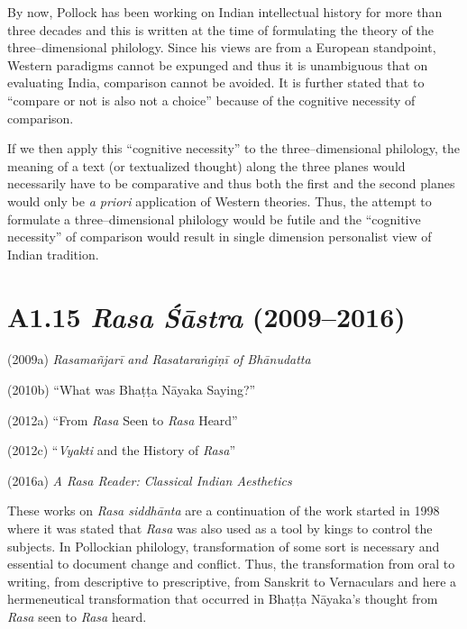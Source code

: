 By now, Pollock has been working on Indian intellectual history for more than three decades and this is written at the time of formulating the theory of the three–dimensional philology. Since his views are from a European standpoint, Western paradigms cannot be expunged and thus it is unambiguous that on evaluating India, comparison cannot be avoided. It is further stated that to “compare or not is also not a choice” because of the cognitive necessity of comparison.

If we then apply this “cognitive necessity” to the three–dimensional philology, the meaning of a text (or textualized thought) along the three planes would necessarily have to be comparative and thus both the first and the second planes would only be \textit{a priori} application of Western theories. Thus, the attempt to formulate a three–dimensional philology would be futile and the “cognitive necessity” of comparison would result in single dimension personalist view of Indian tradition.

\vspace{-.3cm}

\section*{A1.15 {\it{\textbf{Rasa Śāstra}}} (2009–2016)}

(2009a)\textit{ Rasamañjarī and Rasataraṅgiṇī of Bhānudatta}

(2010b) “What was Bhaṭṭa Nāyaka Saying?”

(2012a) “From \textit{Rasa} Seen to \textit{Rasa} Heard”

(2012c) “\textit{Vyakti }and the History of\textit{ Rasa}”

(2016a) \textit{A Rasa Reader: Classical Indian Aesthetics}

These works on \textit{Rasa siddhānta} are a continuation of the work started in 1998 where it was stated that \textit{Rasa} was also used as a tool by kings to control the subjects. In Pollockian philology, transformation of some sort is necessary and essential to document change and conflict. Thus, the transformation from oral to writing, from descriptive to prescriptive, from Sanskrit to Vernaculars and here a hermeneutical transformation that occurred in Bhaṭṭa Nāyaka’s thought from\textit{ Rasa} seen to \textit{Rasa} heard.

